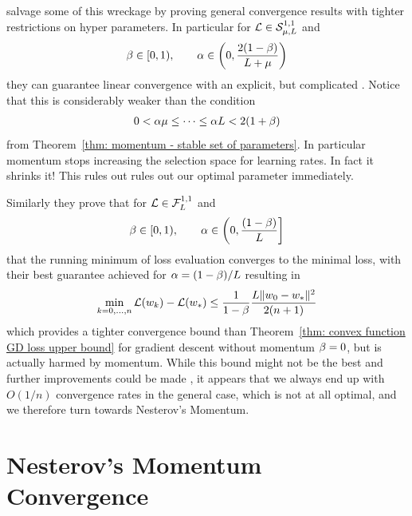 \textcite{ghadimiGlobalConvergenceHeavyball2015} salvage some of this wreckage
by proving general convergence results with tighter restrictions on hyper
parameters. In particular for \(\mathcal{L}\in\mathcal{S}^{1,1}_{{\mu},{L}}\) and
\begin{align*}
	\beta\in[0,1),
	\qquad \alpha\in \left(0, \frac{2(1-\beta)}{L+\mu}\right)
\end{align*}
they can guarantee linear convergence with an explicit, but complicated
. Notice that this is
considerably weaker than the condition
\begin{align*}
	0<\alpha\mu \le \dots \le \alpha L < 2(1+\beta)
\end{align*}
from Theorem~\ref{thm: momentum - stable set of parameters}. In particular
momentum stops increasing the selection space for learning rates. In fact it
shrinks it!
This rules out rules out our optimal parameter immediately. 

Similarly they prove that for \(\mathcal{L}\in\mathcal{F}^{1,1}_{L}\) and
\begin{align*}
	\beta\in[0,1),
	\qquad \alpha\in \left(0, \frac{(1-\beta)}{L}\right]
\end{align*}
that the running minimum of loss evaluation converges to the minimal loss,
with their best guarantee achieved for \(\alpha =(1-\beta)/L\)
resulting in
\begin{align*}
	\min_{k=0,\dots,n}\mathcal{L}(w_k) -\mathcal{L}(w_*)
	\le \frac{1}{1-\beta}\frac{L\|w_0-w_*\|^2}{2(n+1)}
\end{align*}
which provides a tighter convergence bound than 
Theorem~\ref{thm: convex function GD loss upper bound} for gradient descent 
without momentum \(\beta=0\), but is actually harmed by momentum. While
this bound might not be the best and further improvements could be made
\parencite[see e.g.][]{sunNonErgodicConvergenceAnalysis2019}, it appears that we
always end up with \(O(1/n)\) convergence rates in the general case, which is not
at all optimal, and we
therefore turn towards Nesterov's Momentum.

\section{Nesterov's Momentum Convergence}\label{sec: nesterov momentum convergence}

